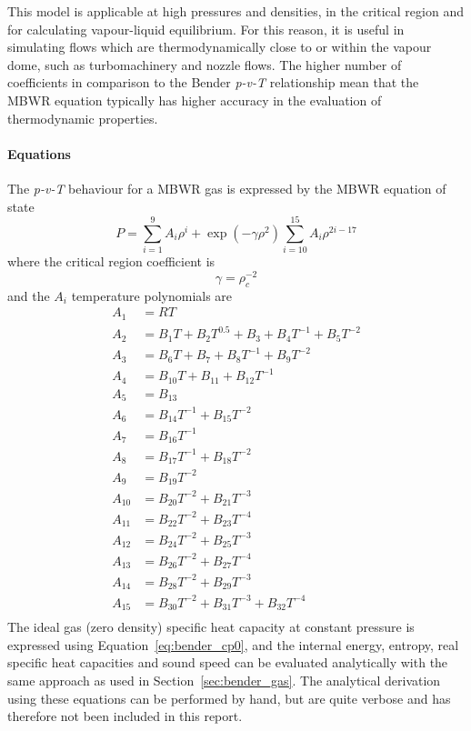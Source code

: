 This model is applicable at high pressures and densities, in the critical region and
for calculating vapour-liquid equilibrium. For this reason, it is useful in
simulating flows which are thermodynamically close to or within the vapour dome,
such as turbomachinery and nozzle flows. The higher number of coefficients in
comparison to the Bender \textit{p-v-T} relationship mean that the MBWR equation
typically has higher accuracy in the evaluation of thermodynamic properties.

\paragraph{Equations}
The \textit{p-v-T} behaviour for a MBWR gas is expressed by the MBWR equation of state \cite{jacobsen1973thermodynamic}
\begin{dmath}
P = \sum_{i=1}^9 A_i \rho^i + \exp{\left(-\gamma \rho^2\right)}\sum_{i=10}^{15} A_i \rho^{2i-17}
\end{dmath}
where the critical region coefficient is
\begin{dmath}
\gamma = \rho_c^{-2}
\end{dmath}
and the \(A_i\) temperature polynomials are
\begin{align*}
A_1 &= RT\\
A_2 &= B_1 T + B_2 T^{0.5} + B_3 + B_4 T^{-1} + B_5 T^{-2}\\
A_3 &= B_6 T + B_7 + B_8 T^{-1} + B_9 T^{-2}\\
A_4 &= B_{10} T + B_{11} + B_{12} T^{-1}\\
A_5 &= B_{13}\\
A_6 &= B_{14} T^{-1} + B_{15} T^{-2}\\
A_7 &= B_{16} T^{-1}\\
A_8 &= B_{17} T^{-1} + B_{18} T^{-2}\\
A_9 &= B_{19} T^{-2}\\
A_{10} &= B_{20} T^{-2} + B_{21} T^{-3}\\
A_{11} &= B_{22} T^{-2} + B_{23} T^{-4}\\
A_{12} &= B_{24} T^{-2} + B_{25} T^{-3}\\
A_{13} &= B_{26} T^{-2} + B_{27} T^{-4}\\
A_{14} &= B_{28} T^{-2} + B_{29} T^{-3}\\
A_{15} &= B_{30} T^{-2} + B_{31} T^{-3} + B_{32} T^{-4}\\
\end{align*}
The ideal gas (zero density) specific heat capacity at constant pressure is
expressed using Equation~\ref{eq:bender_cp0}, and the internal energy, entropy,
real specific heat capacities and sound speed can be evaluated analytically with
the same approach as used in Section~\ref{sec:bender_gas}. The analytical
derivation using these equations can be performed by hand, but are quite verbose
and has therefore not been included in this report.

